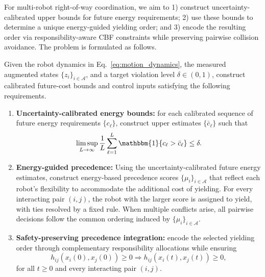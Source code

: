 For multi-robot right-of-way coordination, we aim to 1) construct uncertainty-calibrated upper bounds for future energy requirements; 
2) use these bounds to determine a unique energy-guided yielding order; and
3) encode the resulting order via responsibility-aware CBF constraints while preserving pairwise collision avoidance.
The problem is formulated as follows.

\begin{problem}
\label{prob:main}
Given the robot dynamics in Eq.~\eqref{eq:motion_dynamics}, the measured augmented states $\{z_i\}_{i\in\mathcal{A}}$, and a target violation level $\delta\in(0,1)$, construct calibrated future-cost bounds and control inputs satisfying the following requirements.

\begin{enumerate}
    \item \textbf{Uncertainty-calibrated energy bounds:} for each calibrated sequence of future energy requirements $\{c_\ell\}$, construct upper estimates $\{\bar{c}_\ell\}$ such that
    \begin{equation}
        \limsup_{L\rightarrow\infty}\frac{1}{L}\sum_{\ell=1}^L\mathbbm{1}\{c_\ell>\bar{c}_\ell\}\leq \delta.
        \label{eq:target_violation_rate}
    \end{equation}

    \item \textbf{Energy-guided precedence:} Using the uncertainty-calibrated future energy estimates, construct energy-based precedence scores $\{\mu_i\}_{i\in\mathcal{A}}$ that reflect each robot's flexibility to accommodate the additional cost of yielding. For every interacting pair $(i, j)$, the robot with the larger score is assigned to yield, with ties resolved by a fixed rule. When multiple conflicts arise, all pairwise decisions follow the common ordering induced by $\{\mu_i\}_{i\in\mathcal{A}}$.
    
    \item \textbf{Safety-preserving precedence integration:} encode the selected yielding order through complementary responsibility allocations while ensuring
    \begin{equation}
        h_{ij}(x_i(0), x_j(0)) \geq 0 \Longrightarrow h_{ij}(x_i(t),x_j(t))\geq 0,
        \label{eq:pairwise_safety_objective}
    \end{equation}
    for all $t\geq 0$ and every interacting pair $(i, j)$.
    
\end{enumerate}

\end{problem}